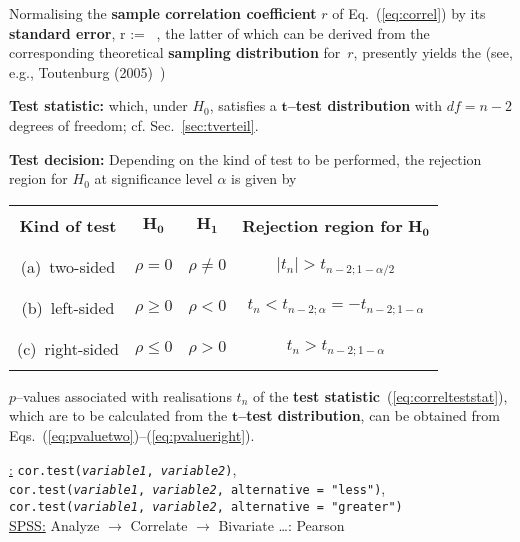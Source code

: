 \medskip
\noindent
Normalising the \textbf{sample correlation coefficient} $r$ of 
Eq.~(\ref{eq:correl}) by its \textbf{standard error},
%
\be
{}r := \ ,
\ee
%
the latter of which can be derived from the corresponding 
theoretical \textbf{sampling distribution} for~$r$, presently
yields the (see, e.g., Toutenburg (2005)~)

\medskip
\noindent
\textbf{Test statistic:}
%
\be
{}
\ee
%
which, under $H_{0}$, satisfies a $\boldsymbol{t}$\textbf{--test
distribution} with $df=n-2$ degrees of freedom; cf.
Sec.~\ref{sec:tverteil}.

\medskip
\noindent
\textbf{Test decision:} Depending on the kind of test to be 
performed, the rejection region for $H_{0}$ at significance level 
$\alpha$ is given by
%
\begin{center}
\begin{tabular}[h]{c|c|c|c}
 & & & \\
\textbf{Kind of test} & $\boldsymbol{H_{0}}$ &
$\boldsymbol{H_{1}}$ &
\textbf{Rejection region for} $\boldsymbol{H_{0}}$ \\
 & & & \\
\hline
 & & & \\
(a)~two-sided & $\rho=0$ & $\rho \neq 0$ &
$|t_{n}|>t_{n-2;1-\alpha/2}$ \\
 & & & \\
\hline
 & & & \\
(b)~left-sided & $\rho \geq 0$ & $\rho<0$ &
$t_{n}<t_{n-2;\alpha}=-t_{n-2;1-\alpha}$ \\
 & & & \\
\hline
 & & & \\
(c)~right-sided & $\rho \leq 0$ & $\rho>0$ &
$t_{n}>t_{n-2;1-\alpha}$ \\
 & & &
\end{tabular}
\end{center}
%
$p$--values associated with realisations $t_{n}$ of the
\textbf{test statistic}~(\ref{eq:correlteststat}), which are to be
calculated from the
$\boldsymbol{t}$\textbf{--test distribution}, can  be obtained from 
Eqs.~(\ref{eq:pvaluetwo})--(\ref{eq:pvalueright}).

\medskip
\noindent
\underline{\R:} \texttt{cor.test(\textit{variable1},
\textit{variable2})}, \\
\texttt{cor.test(\textit{variable1}, \textit{variable2}, 
alternative = "less")}, \\
\texttt{cor.test(\textit{variable1}, \textit{variable2}, 
alternative = "greater")} \\
\underline{SPSS:} Analyze $\rightarrow$ Correlate
$\rightarrow$ Bivariate \ldots: Pearson

